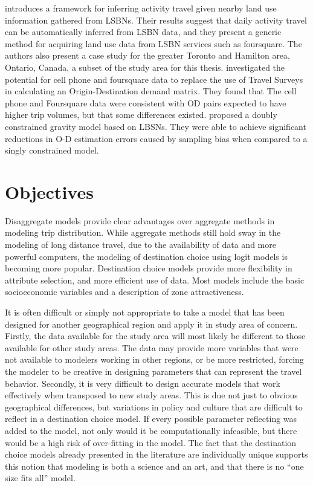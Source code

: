 \textcite{abdulazim2015framework} introduces a framework for inferring activity travel given nearby land use information gathered from LSBNs. Their results suggest that daily activity travel can be automatically inferred from LSBN data, and they present a generic method for acquiring land use data from LSBN services such as foursquare. The authors also present a case study for the  greater Toronto and Hamilton area, Ontario, Canada, a subset of the study area for this thesis.
\textcite{sa2015origin} investigated the potential for cell phone and foursquare data to replace the use of Travel Surveys in calculating an Origin-Destination demand matrix. They found that The cell phone and Foursquare data were consistent with OD pairs expected to have higher trip volumes, but that some differences existed.
\textcite{jin2014location} proposed a doubly constrained gravity model based on LBSNs. They were able to achieve significant reductions in O-D estimation errors caused by sampling bias when compared to a singly constrained model.

\section{Objectives}
Disaggregate models provide clear advantages over aggregate methods in modeling trip distribution. While aggregate methods still hold sway in the modeling of long distance travel, due to the availability of data and more powerful computers, the modeling of destination choice using logit models is becoming more popular. Destination choice models provide more flexibility in attribute selection, and more efficient use of data. Most models include the basic socioeconomic variables and a description of zone attractiveness. 

It is often difficult or simply not appropriate to take a model that has been designed for another geographical region and apply it in study area of concern. Firstly, the data available for the study area will most likely be different to those available for other study areas. The data may provide more variables that were not available to modelers working in other regions, or be more restricted, forcing the modeler to be creative in designing parameters that can represent the travel behavior. Secondly, it is very difficult to design accurate models that work effectively when transposed to new study areas. This is due not just to obvious geographical differences, but variations in policy and culture that are difficult to reflect in a destination choice model. If every possible parameter reflecting was added to the model, not only would it be computationally infeasible, but there would be a high risk of over-fitting in the model. The fact that the destination choice models already presented in the literature are individually unique supports this notion that modeling is both a science and an art, and that there is no \enquote{one size fits all} model.

